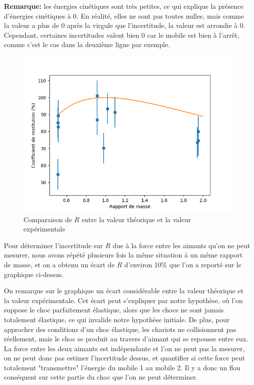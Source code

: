 \documentclass[12pt]{article}
\begin{document}
\textbf{Remarque:} les énergies cinétiques sont très petites, ce qui explique la présence d'énergies cinétiques à $0$. En réalité, elles ne sont pas toutes nulles,
mais comme la valeur a plus de $0$ après la virgule que l'incertitude, la valeur est arrondie à 0. Cependant, certaines incertitudes valent bien 0 car le mobile 
est bien à l'arrêt, comme c'est le cas dans la deuxième ligne par exemple.

\begin{figure}[h!]
    \begin{center}
        \includegraphics[scale=0.8]{RapportMasse.png}
    \end{center}
    \caption{Comparaison de $R$ entre la valeur théorique et la valeur expérimentale}
\end{figure}

Pour déterminer l'incertitude sur $R$ due à la force entre les aimants qu'on ne peut mesurer, nous avons répété plusieurs fois la même situation à un même rapport de masse, 
et on a obtenu un écart de $R$ d'environ 10\% que l'on a reporté sur le graphique ci-dessus.

\newpage
On remarque sur le graphique un écart considérable entre la valeur théorique et la valeur expérimentale. Cet écart peut s'expliquer par notre hypothèse, où l'on suppose le choc parfaitement élastique, alors
que les chocs ne sont jamais totalement élastique, ce qui invalide notre hypothèse initiale. De plus, pour approcher des conditions d'un choc élastique, les chariots ne collisionnent pas réellement, mais le choc se produit
au travers d'aimant qui se repousse entre eux. La force entre les deux aimants est indépendante et l'on ne peut pas la mesurer, on ne peut donc pas estimer l'incertitude dessus, et quantifier si cette force 
peut totalement "transmettre" l'énergie du mobile 1 au mobile 2. Il y a donc un flou conséquent sur cette partie du choc que l'on ne peut déterminer.
\end{document}
